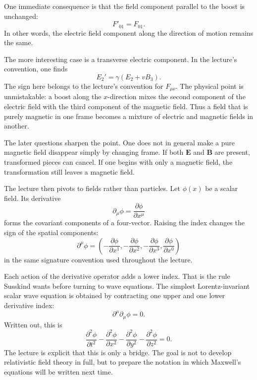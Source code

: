 One immediate consequence is that the field component parallel to the boost is unchanged:
\begin{equation}
F'_{01}=F_{01}.
\end{equation}
In other words, the electric field component along the direction of motion remains the same.

The more interesting case is a transverse electric component. In the lecture's convention, one finds
\begin{equation}
E_2'=\gamma(E_2+vB_3).
\end{equation}
The sign here belongs to the lecture's convention for \(F_{\mu\nu}\). The physical point is unmistakable: a boost along the \(x\)-direction mixes the second component of the electric field with the third component of the magnetic field. Thus a field that is purely magnetic in one frame becomes a mixture of electric and magnetic fields in another.

The later questions sharpen the point. One does not in general make a pure magnetic field disappear simply by changing frame. If both \(\mathbf E\) and \(\mathbf B\) are present, transformed pieces can cancel. If one begins with only a magnetic field, the transformation still leaves a magnetic field.

The lecture then pivots to fields rather than particles. Let \(\phi(x)\) be a scalar field. Its derivative
\begin{equation}
\partial_\mu \phi = \frac{\partial \phi}{\partial x^\mu}
\end{equation}
forms the covariant components of a four-vector. Raising the index changes the sign of the spatial components:
\begin{equation}
\partial^\mu \phi
=
\left(
-\frac{\partial \phi}{\partial x^1},
-\frac{\partial \phi}{\partial x^2},
-\frac{\partial \phi}{\partial x^3},
\frac{\partial \phi}{\partial x^0}
\right)
\end{equation}
in the same signature convention used throughout the lecture.

Each action of the derivative operator adds a lower index. That is the rule Susskind wants before turning to wave equations. The simplest Lorentz-invariant scalar wave equation is obtained by contracting one upper and one lower derivative index:
\begin{equation}
\partial^\mu \partial_\mu \phi = 0.
\end{equation}
Written out, this is
\begin{equation}
\frac{\partial^2 \phi}{\partial t^2}
-
\frac{\partial^2 \phi}{\partial x^2}
-
\frac{\partial^2 \phi}{\partial y^2}
-
\frac{\partial^2 \phi}{\partial z^2}
=
0.
\end{equation}
The lecture is explicit that this is only a bridge. The goal is not to develop relativistic field theory in full, but to prepare the notation in which Maxwell's equations will be written next time.

